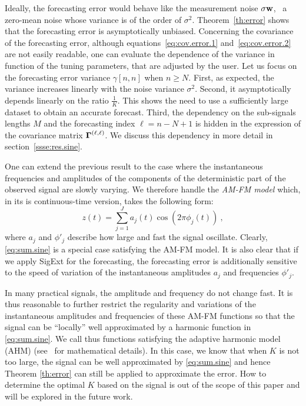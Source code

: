 Ideally, the forecasting error would behave like the measurement noise $\sigma{\mathbf w}$, \ie~a zero-mean noise whose variance is of the order of $\sigma^2$. Theorem~\ref{th:error} shows that the forecasting error is asymptotically unbiased. Concerning the covariance of the forecasting error, although equations~\eqref{eq:cov.error.1} and~\eqref{eq:cov.error.2} are not easily readable, one can evaluate the dependence of the variance in function of the tuning parameters, that are adjusted by the user. Let us focus on the forecasting error variance $\gamma[n,n]$ when $n\geq N$. First, as expected, the variance increases linearly with the noise variance $\sigma^2$. Second, it asymptotically depends linearly on the ratio $\frac{1}{K}$. This shows the need to use a sufficiently large dataset to obtain an accurate forecast. Third, the dependency on the sub-signals lengths $M$ and the forecasting index $\ell=n-N+1$ is hidden in the expression of the covariance matrix $\boldsymbol{\Gamma}^{(\ell,\ell)}$. We discuss this dependency in more detail in section~\ref{ssse:res.sine}.

\begin{remark}\label{RemarkAHM}
One can extend the previous result to the case where the instantaneous frequencies and amplitudes of the components of the deterministic part of the observed signal are slowly varying. We therefore handle the \textit{AM-FM model} which, in its is continuous-time version, takes the following form:
\begin{equation}
z(t) = \sum_{j=1}^J a_j(t)\cos(2\pi\phi_j(t))\ ,
\end{equation}
where $a_j$ and $\phi'_j$ describe how large and fast the signal oscillate. 
Clearly, \eqref{eq:sum.sine} is a special case satisfying the AM-FM model. It is also clear that if we apply {\sf SigExt} for the forecasting, the forecasting error is additionally sensitive to the speed of variation of the instantaneous amplitudes $a_j$ and frequencies $\phi'_j$. 
%

In many practical signals, the amplitude and frequency do not change fast. It is thus reasonable to further restrict the regularity and variations of the instantaneous amplitudes and frequencies of these AM-FM functions so that the signal can be ``locally'' well approximated by a harmonic function in \eqref{eq:sum.sine}. We call thus functions satisfying the adaptive harmonic model (AHM) (see~\cite{Chen14nonparametric,Daubechies16conceft} for mathematical details). In this case, we know that when $K$ is not too large, the signal can be well approximated by \eqref{eq:sum.sine} and hence Theorem \ref{th:error} can still be applied to approximate the error. How to determine the optimal $K$ based on the signal is out of the scope of this paper and will be explored in the future work.
\end{remark}


